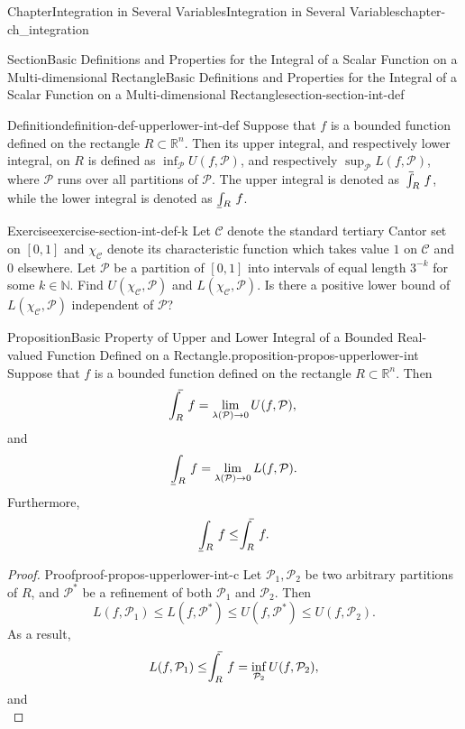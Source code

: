 \documentclass[oneside,10pt,]{book}
\makeatletter
\numberwithin{equation}{section}
\newcommand{\bbR}{\mathbb{R}}
\newcommand{\bbN}{\mathbb{N}}
\newcommand{\cC}{\mathcal{C}}
\newcommand{\cP}{\mathcal{P}}
\def\upint{\mathchoice
    {\mkern10mu\overline{\vphantom{\intop}\mkern7mu}\mkern-24mu}
    {\mkern7mu\overline{\vphantom{\intop}\mkern7mu}\mkern-14mu}
    {\mkern7mu\overline{\vphantom{\intop}\mkern7mu}\mkern-14mu}
    {\mkern7mu\overline{\vphantom{\intop}\mkern7mu}\mkern-14mu}
  \int}
\def\lowint{\relax\if@display
 \mkern3mu\underline{\vphantom{\intop}\mkern7mu}\mkern-10mu\int
\else 
\underline{\vphantom{\int}\mkern7mu}\mkern-10mu\int
\fi}
\makeatother
\begin{document}
\begin{chapterptx}{Chapter}{Integration in Several Variables}{}{Integration in Several Variables}{}{}{chapter-ch_integration}
\begin{sectionptx}{Section}{Basic Definitions and Properties for the Integral of a Scalar Function on a Multi-dimensional Rectangle}{}{Basic Definitions and Properties for the Integral of a Scalar Function on a Multi-dimensional Rectangle}{}{}{section-section-int-def}
\begin{definition}{Definition}{}{definition-def-upperlower-int-def}
\label{notation-def-upperlower-int-def-b}%
Suppose that \(f\) is a bounded function defined on the rectangle \(R\subset \bbR^{n}\). Then its upper integral, and respectively lower integral, on \(R\) is defined as \(\inf_{\cP}U(f, \cP)\), and respectively \(\sup_{\cP}L(f, \cP)\), where \(\cP\) runs over all partitions of \(\cP\). The upper integral is denoted as \(\upint_{R}\,f\), while the lower integral is denoted as \(\lowint_{R}\,f\).\end{definition}
\begin{inlineexercise}{Exercise}{}{exercise-section-int-def-k}%
Let \(\cC\) denote the standard tertiary Cantor set on \([0, 1]\) and \(\chi_{\cC}\) denote its characteristic function which takes  value \(1\) on \(\cC\) and \(0\) elsewhere. Let \(\cP\) be a partition of \([0, 1]\) into intervals of equal length \(3^{-k}\) for some \(k\in \bbN\). Find \(U(\chi_{\cC}, \cP)\) and \(L(\chi_{\cC}, \cP)\). Is there a positive lower bound of \(L(\chi_{\cC}, \cP)\) independent of \(\cP\)?%
\end{inlineexercise}%
\begin{proposition}{Proposition}{Basic Property of Upper and Lower Integral of a Bounded Real-valued Function Defined on a Rectangle.}{}{proposition-propos-upperlower-int}%
Suppose that \(f\) is a bounded function defined on the rectangle \(R\subset \bbR^{n}\). Then%
\begin{equation*}
\upint_{R}\,f= \lim_{\lambda(\cP)\to 0} U(f, \cP),
\end{equation*}
and%
\begin{equation*}
\lowint_{R}\,f = \lim_{\lambda(\cP)\to 0} L(f, \cP).
\end{equation*}
Furthermore,%
\begin{equation*}
\lowint_{R}\,f \le  \upint_{R}\,f.
\end{equation*}
\end{proposition}
\begin{proof}{Proof}{}{proof-propos-upperlower-int-c}
Let \(\cP_{1}, \cP_{2}\) be two arbitrary partitions of \(R\), and \(\cP^{*}\) be a refinement of both \(\cP_{1}\) and \(\cP_{2}\). Then%
\begin{equation*}
L(f, \cP_{1})\le L(f, \cP^{*})\le U(f, \cP^{*})\le U(f, \cP_{2}).
\end{equation*}
As a result,%
\begin{equation*}
L(f, \cP_{1})\le  \upint_{R} \, f =\inf_{\cP_{2}} U(f, \cP_{2}),
\end{equation*}
and%
\begin{equation*}

\end{equation*}
\end{proof}
\end{sectionptx}
\end{chapterptx}
\end{document}
